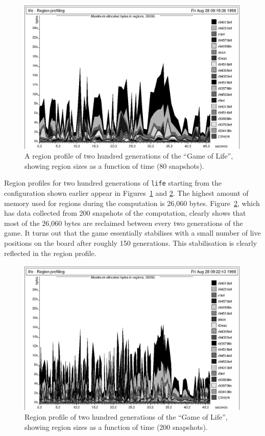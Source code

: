 \documentclass[12pt]{book}
\begin{document}
\begin{figure}
\begin{center}
\includegraphics{life80.ps}
\end{center}
\caption{A region profile of two hundred 
generations of the ``Game of Life'', showing
region sizes as a function of time (80 snapshots).}
\label{lifeprof80.fig}
\end{figure}


Region profiles for two hundred generations of {\tt life} starting from the configuration
shown earlier appear in Figures~\ref{lifeprof80.fig} and \ref{lifeprof200.fig}.
The highest amount of memory used for regions during the computation is
26,060 bytes. Figure~\ref{lifeprof200.fig}, which has data collected from 200 snapshots
of the computation, clearly shows that most of the 26,060 bytes are reclaimed between
every two generations of the game. It turns out that the game essentially stabilises
with a small number of live positions on the board after roughly 150 generations.
This stabilisation is clearly reflected in the region profile.

\begin{figure}
\begin{center}
\includegraphics{life200.ps}
\end{center}
\caption{Region profile of two hundred 
generations of the ``Game of Life'', showing
region sizes as a function of time (200 snapshots).}
\label{lifeprof200.fig}
\end{figure}
\end{document}
